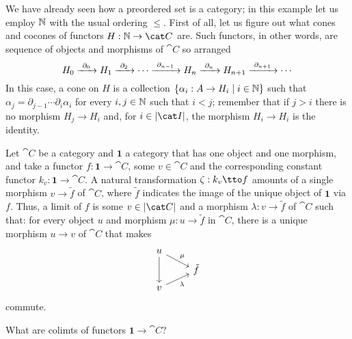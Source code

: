 \begin{example}
  We have already seen how a preordered set is a category; in this
  example let us employ \(\mathbb N\) with the usual ordering
  \(\le\). First of all, let us figure out what cones and cocones of
  functors \(H : \naturals \to \cat C\) are. Such functors, in other
  words, are sequence of objects and morphisms of \(\cat C\) so
  arranged
  \[H_0 \xrightarrow{\ \partial_0\ } H_1 \xrightarrow{\ \partial_2\ } \cdots \xrightarrow{\ \partial_{n-1}\ } H_n
    \xrightarrow{\ \partial_n\ } H_{n+1} \xrightarrow{\ \partial_{n+1}\ } \cdots\] In this case, a cone on
  \(H\) is a collection
  \(\left\{\alpha_i : A \to H_i \mid i \in \mathbb N\right\}\) such that
  \(\alpha_j = \partial_{j-1} \cdots \partial_i \alpha_i\) for every
  \(i, j \in \mathbb N\) such that \(i < j\); remember that if
  \(j > i\) there is no morphism \(H_j \to H_i\) and, for
  \(i \in \obj{\cat I}\), the morphism \(H_i \to H_i\) is the identity.
\end{example}

\begin{example}
   Let \(\cat C\) be a category and
  \(\mathbf 1\) a category that has one object and one morphism, and
  take a functor \(f : \mathbf 1 \to \cat C\), some \(v \in \cat C\) and
  the corresponding constant functor \(k_v : \mathbf 1 \to \cat C\). A
  natural transformation \(\zeta : k_v \tto f\) amounts of a single
  morphism \(v \to \tilde f\) of \(\cat C\), where \(\tilde f\)
  indicates the image of the unique object of \(\mathbf 1\) via
  \(f\). Thus, a limit of \(f\) is some \(v \in \obj{\cat C}\) and a
  morphism \(\lambda : v \to \tilde f\) of \(\cat C\) such that: for every
  object \(u\) and morphism \(\mu : u \to \tilde f\) in \(\cat C\), there
  is a unique morphism \(u \to v\) of \(\cat C\) that makes
  \[\begin{tikzcd}[row sep=tiny]
      u \ar["\mu", dr] \ar[dd] \\
      & \tilde f \\
      v \ar["\lambda", ur, swap]
    \end{tikzcd}\] commute.
\end{example}

\begin{exercise}
  What are colimts of functors \(\mathbf 1 \to \cat C\)?
\end{exercise}

